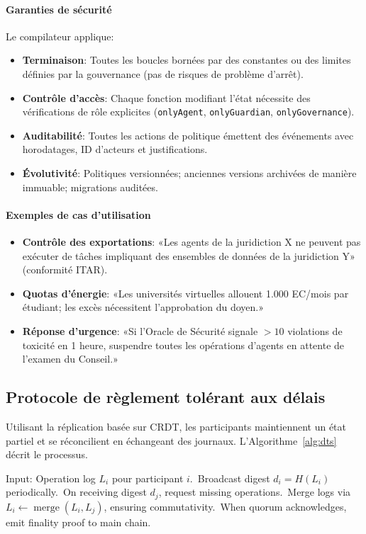 \documentclass[11pt]{article}
\begin{document}
\paragraph{Garanties de sécurité} Le compilateur applique:
\begin{itemize}[noitemsep]
  \item \textbf{Terminaison}: Toutes les boucles bornées par des constantes ou des limites définies par la gouvernance (pas de risques de problème d'arrêt).
  \item \textbf{Contrôle d'accès}: Chaque fonction modifiant l'état nécessite des vérifications de rôle explicites (\texttt{onlyAgent}, \texttt{onlyGuardian}, \texttt{onlyGovernance}).
  \item \textbf{Auditabilité}: Toutes les actions de politique émettent des événements avec horodatages, ID d'acteurs et justifications.
  \item \textbf{Évolutivité}: Politiques versionnées; anciennes versions archivées de manière immuable; migrations auditées.
\end{itemize}

\paragraph{Exemples de cas d'utilisation}
\begin{itemize}[noitemsep]
  \item \textbf{Contrôle des exportations}: «Les agents de la juridiction X ne peuvent pas exécuter de tâches impliquant des ensembles de données de la juridiction Y» (conformité ITAR).
  \item \textbf{Quotas d'énergie}: «Les universités virtuelles allouent 1.000 EC/mois par étudiant; les excès nécessitent l'approbation du doyen.»
  \item \textbf{Réponse d'urgence}: «Si l'Oracle de Sécurité signale $>10$ violations de toxicité en 1 heure, suspendre toutes les opérations d'agents en attente de l'examen du Conseil.»
\end{itemize}

\subsection{Protocole de règlement tolérant aux délais}
Utilisant la réplication basée sur CRDT, les participants maintiennent un état partiel et se réconcilient en échangeant des journaux. L'Algorithme~\ref{alg:dts} décrit le processus.

\begin{algorithm}[H]
  \caption{Delay-Tolerant Settlement (DTS)}
  \label{alg:dts}
  \begin{algorithmic}[1]
    \STATE Input: Operation log $L_i$ pour participant $i$.\
    \STATE Broadcast digest $d_i = H(L_i)$ periodically.\
    \STATE On receiving digest $d_j$, request missing operations.\
    \STATE Merge logs via $L_i \leftarrow \operatorname{merge}(L_i, L_j)$, ensuring commutativity.\
    \STATE When quorum acknowledges, emit finality proof to main chain.\
  \end{algorithmic}
\end{algorithm}
\end{document}
